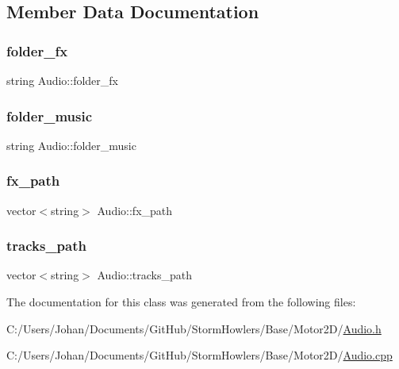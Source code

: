\subsection{Member Data Documentation}
\mbox{\label{class_audio_a2f33c4f728cb34b9d9225f24b7e12fed}} 
\subsubsection{\texorpdfstring{folder\_fx}{folder\_fx}}
{\footnotesize\ttfamily string Audio\+::folder\+\_\+fx}

\mbox{\label{class_audio_aeee37053acc6e828584929773ecc06db}} 
\subsubsection{\texorpdfstring{folder\_music}{folder\_music}}
{\footnotesize\ttfamily string Audio\+::folder\+\_\+music}

\mbox{\label{class_audio_a159ec23ed30c61829850d4917bfb5ce7}} 
\subsubsection{\texorpdfstring{fx\_path}{fx\_path}}
{\footnotesize\ttfamily vector$<$string$>$ Audio\+::fx\+\_\+path}

\mbox{\label{class_audio_ab3d160f5e442a0792424d4a506356a25}} 
\subsubsection{\texorpdfstring{tracks\_path}{tracks\_path}}
{\footnotesize\ttfamily vector$<$string$>$ Audio\+::tracks\+\_\+path}



The documentation for this class was generated from the following files\+:\begin{DoxyCompactItemize}
\item 
C\+:/\+Users/\+Johan/\+Documents/\+Git\+Hub/\+Storm\+Howlers/\+Base/\+Motor2\+D/\mbox{\hyperlink{_audio_8h}{Audio.\+h}}\item 
C\+:/\+Users/\+Johan/\+Documents/\+Git\+Hub/\+Storm\+Howlers/\+Base/\+Motor2\+D/\mbox{\hyperlink{_audio_8cpp}{Audio.\+cpp}}\end{DoxyCompactItemize}
